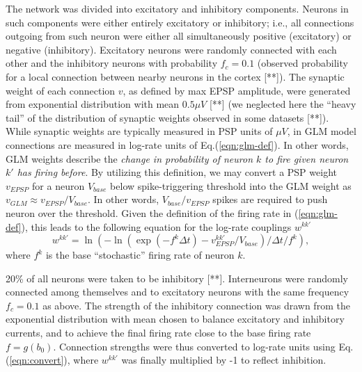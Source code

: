 The network was divided into excitatory and inhibitory components.
Neurons in such components were either entirely excitatory or inhibitory; i.e., all connections outgoing from such neuron were either all simultaneously positive (excitatory) or negative (inhibitory). Excitatory neurons were randomly connected with each other and the inhibitory neurons with probability $f_c=0.1$ (observed probability for a local connection between nearby neurons in the cortex [**]). The synaptic weight of each connection $v$, as defined by max EPSP amplitude, were generated from exponential distribution with mean $0.5 \mu V$ [**] (we neglected here the ``heavy tail'' of the distribution of synaptic weights observed in some datasets [**]).
While synaptic weights are typically measured in PSP units of $\mu V$,
in GLM model connections are measured in log-rate units of Eq.(\ref{eqn:glm-def}).
In other words, GLM weights describe the {\em change in probability of neuron $k$
to fire given neuron $k'$ has firing before}.
By utilizing this definition, we may convert a PSP weight $v_{EPSP}$ for a neuron $V_{base}$ below spike-triggering threshold into the GLM weight as $v_{GLM}\approx v_{EPSP}/V_{base}$. In other words, $V_{base}/v_{EPSP}$ spikes are required to push neuron over the threshold. Given the definition of the firing rate in (\ref{eqn:glm-def}), this
leads to the following equation for the log-rate couplings $w^{kk'}$
\begin{equation}\label{eqn:convert}
w^{kk'}=\ln(-\ln(\exp(-f^k \Delta t)-v^{kk'}_{EPSP}/V_{base})/\Delta t/f^k),
\end{equation}
where $f^k$ is the base ``stochastic'' firing rate of neuron $k$.

20\% of all neurons were taken to be inhibitory [**]. Interneurons were randomly connected among themselves and to excitatory neurons with the same frequency $f_c=0.1$ as above. The strength of the inhibitory connection was drawn from the exponential distribution with mean chosen to balance excitatory and inhibitory currents, and to achieve the final firing rate close to the base firing rate $f=g(b_0)$. Connection strengths were thus converted to log-rate units using Eq.(\ref{eqn:convert}), where $w^{kk'}$ was finally multiplied by -1 to reflect inhibition.

